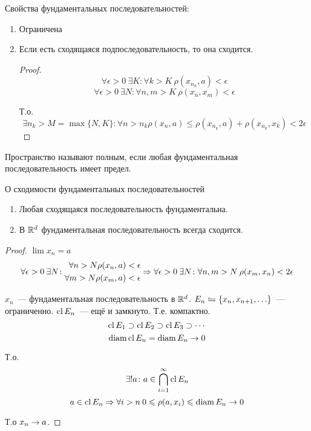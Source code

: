 ﻿Свойства фундаментальных последовательностей:
\begin{enumerate}
\item Ограничена
\item Если есть сходящаяся подпоследовательность, то она сходится.
\begin{proof}
$$\forall \epsilon > 0\: \exists K\colon \forall k > K\: \rho(x_{n_k}, a) < \epsilon$$
$$\forall \epsilon > 0\: \exists N\colon \forall n,m > K\: \rho(x_n, x_m) < \epsilon$$

Т.о.
$$\exists n_k > M = \max\{N, K\}\colon \forall n > n_k \rho(x_n, a) \leqslant \rho(x_{n_k}, a) + \rho(x_{n_k}, x_k) < 2\epsilon$$
\end{proof}
\end{enumerate}

\begin{Def}
Пространство называют полным, если любая фундаментальная последовательность имеет предел.
\end{Def}   

\begin{theorem}{О сходимости фундаментальных последовательностей}
\begin{enumerate}
\item Любая сходящаяся последовательность фундаментальна.
\item В $\mathbb{R}^d$ фундаментальная последовательность всегда сходится.
\end{enumerate}
\end{theorem}
\begin{proof}
$\lim x_n = a$
$$\forall \epsilon > 0\: \exists N\colon \begin{aligned}\forall n>N \rho(x_n, a) &< \epsilon \\ \forall m>N \rho(x_m, a) &< \epsilon\end{aligned} \Rightarrow \forall \epsilon>0\: \exists N\colon \forall n,m>N\: \rho(x_m, x_n) < 2\epsilon$$

$x_n$~--- фундаментальная последовательность в $\mathbb{R}^d$. $E_n \leftrightharpoons \{x_n, x_{n+1}, \ldots\}$~--- ограниченно.
$\operatorname{cl} E_n$~--- ещё и замкнуто. Т.е. компактно.
$$\operatorname{cl} E_1 \supset \operatorname{cl} E_2 \supset \operatorname{cl} E_3 \supset \cdots$$
$$\operatorname{diam} \operatorname{cl} E_n = \operatorname{diam} E_n \rightarrow 0$$

Т.о.
$$\exists! a\colon a \in \bigcap_{i=1}^{\infty} \operatorname{cl} E_n$$
$$a \in \operatorname{cl} E_n \Rightarrow \forall i>n\:0\leqslant\rho(a, x_i) \leqslant \operatorname{diam} E_n \rightarrow 0$$

Т.о $x_n \rightarrow a$.
\end{proof}
                                                

